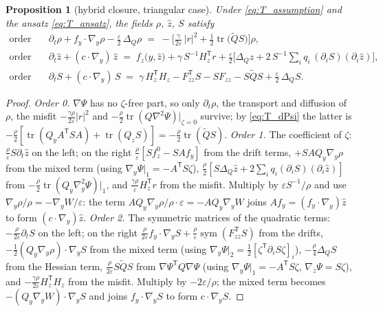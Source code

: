\documentclass[11pt,a4paper]{article}
\newcommand{\tr}{\operatorname{tr}}
\newcommand{\T}{^{\mathsf T}}
\newcommand{\zh}{\hat{z}}
\newcommand{\eps}{\varepsilon}
\newcommand{\abs}[1]{\left\lvert #1 \right\rvert}
\newcommand{\grad}{\nabla}
\newcommand{\gy}{\nabla_{\!y}}
\newcommand{\gz}{\nabla_{\!z}}
\newcommand{\Hy}{\nabla_{\!y}^2}
\theoremstyle{plain}
\newtheorem{proposition}{Proposition}
\theoremstyle{definition}
\theoremstyle{remark}
\begin{document}
\begin{proposition}[hybrid closure, triangular case]
Under \eqref{eq:T_assumption} and the ansatz \eqref{eq:T_ansatz}, the fields $\rho$, $\zh$, $S$ satisfy
\begin{align}
  \text{order 0:}\quad & \partial_t\rho + f_y\cdot\gy\rho - \frac\eps2\,\Delta_Q\rho \;=\; -\Big[\frac{\gamma}{2\eps}\,\abs{r}^2 + \frac12\tr\big(\tilde QS\big)\Big]\rho , \label{eq:T_rho}\\
  \text{order 1:}\quad & \partial_t\zh + (c\cdot\gy)\,\zh \;=\; f_z\big(y,\zh\big) + \gamma\,S^{-1}H_z\T r
    + \frac\eps2\Big[\Delta_Q\zh + 2\,S^{-1}\!\sum_iq_i\,(\partial_iS)(\partial_i\zh)\Big], \label{eq:T_zhat}\\
  \text{order 2:}\quad & \partial_tS + (c\cdot\gy)\,S \;=\; \gamma\,H_z\T H_z - F_{zz}\T S - SF_{zz} - S\tilde QS + \frac\eps2\,\Delta_QS . \label{eq:T_S}
\end{align}
\end{proposition}
\begin{proof}
\emph{Order 0.} $\grad\Psi$ has no $\zeta$-free part, so only $\partial_t\rho$, the transport and diffusion of $\rho$, the misfit $-\tfrac{\gamma\rho}{2\eps}\abs r^2$ and $-\tfrac\rho2\tr(Q\grad^2\Psi)|_{\zeta=0}$ survive; by \eqref{eq:T_dPsi} the latter is $-\tfrac\rho2[\tr(Q_yA\T SA) + \tr(Q_zS)] = -\tfrac\rho2\tr(\tilde QS)$.
\emph{Order 1.} The coefficient of $\zeta$: $\tfrac\rho\eps S\partial_t\zh$ on the left; on the right $\tfrac\rho\eps[Sf_z^0 - SAf_y]$ from the drift terms, $+SAQ_y\gy\rho$ from the mixed term (using $\gy\Psi|_1 = -A\T S\zeta$), $\tfrac\rho2[S\Delta_Q\zh + 2\sum_iq_i(\partial_iS)(\partial_i\zh)]$ from $-\tfrac\rho2\tr(Q_y\Hy\Psi)|_1$, and $\tfrac{\gamma\rho}\eps H_z\T r$ from the misfit. Multiply by $\eps S^{-1}/\rho$ and use $\gy\rho/\rho = -\gy W/\eps$: the term $AQ_y\gy\rho/\rho\cdot\eps = -AQ_y\gy W$ joins $Af_y = (f_y\cdot\gy)\zh$ to form $(c\cdot\gy)\zh$.
\emph{Order 2.} The symmetric matrices of the quadratic terms: $-\tfrac{\rho}{2\eps}\partial_tS$ on the left; on the right $\tfrac{\rho}{2\eps}f_y\cdot\gy S + \tfrac\rho\eps\operatorname{sym}(F_{zz}\T S)$ from the drifts, $-\tfrac12(Q_y\gy\rho)\cdot\gy S$ from the mixed term (using $\gy\Psi|_2 = \tfrac12[\zeta\T\partial_iS\zeta]_i$), $-\tfrac\rho4\Delta_QS$ from the Hessian term, $\tfrac{\rho}{2\eps}S\tilde QS$ from $\grad\Psi\T Q\grad\Psi$ (using $\gy\Psi|_1 = -A\T S\zeta$, $\gz\Psi = S\zeta$), and $-\tfrac{\gamma\rho}{2\eps}H_z\T H_z$ from the misfit. Multiply by $-2\eps/\rho$; the mixed term becomes $-(Q_y\gy W)\cdot\gy S$ and joins $f_y\cdot\gy S$ to form $c\cdot\gy S$.
\end{proof}
\end{document}
